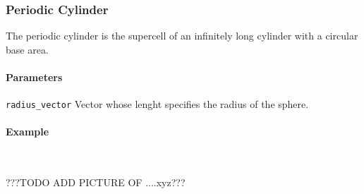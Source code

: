 \subsubsection{Periodic Cylinder}
The periodic cylinder is the supercell of an infinitely long cylinder with a circular base area.

\paragraph{Parameters}
\begin{description}
 \item{\lstinline{radius_vector}} Vector whose lenght specifies the radius of the sphere.
\end{description}

\paragraph{Example}\ 

%
???TODO ADD PICTURE OF ....xyz???